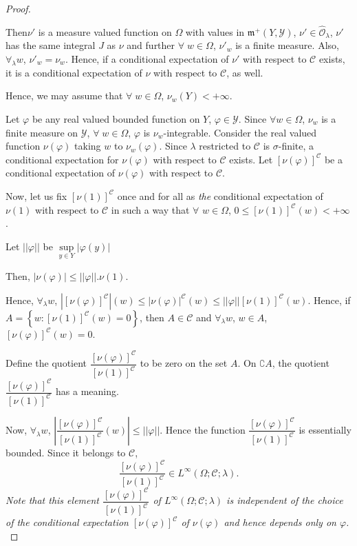 \begin{proof}
\begin{step}
Then\pageoriginale $\nu'$ is a measure valued function on $\Omega$
with values in $\mathfrak{m}^+ (Y, \mathscr{Y})$, $\nu'\in
\hat{\mathscr{O}}_\lambda$, $\nu'$ has the same integral $J$ as $\nu$
and further $\forall \; w \in \Omega$, $\nu'_w$ is a finite
measure. Also, $\forall_\lambda w$, $\nu'_w =\nu_w$. Hence, if a
conditional expectation of $\nu'$ with respect to $\mathscr{C}$
exists, it is a conditional expectation of $\nu$ with respect to
$\mathscr{C}$, as well.
\end{step}

Hence, we may assume that $\forall\; w \in \Omega$, $\nu_w(Y) < +
\infty$. 

Let  $\varphi$ be any real valued bounded function on $Y$, $\varphi
\in \mathscr{Y}$. Since $\forall w \in \Omega$, $\nu_w$ is a finite
measure on $\mathscr{Y}$, $\forall \; w \in \Omega$, $\varphi$ is
$\nu_w$-integrable. Consider the real valued function $\nu(\varphi)$
taking $w$ to $\nu_w(\varphi)$. Since $\lambda$ restricted to
$\mathscr{C}$ is $\sigma$-finite, a conditional expectation for
$\nu(\varphi)$ with respect to $\mathscr{C}$ exists. Let $[\nu
  (\varphi)]^\mathscr{C}$  be a conditional expectation of $\nu
(\varphi)$ with respect to $\mathscr{C}$. 

Now, let us fix $[\nu(1)]^\mathscr{C}$ once and for all as
\textit{the} conditional expectation of $\nu(1)$ with respect to
$\mathscr{C}$ in such a way that $\forall $ $w \in \Omega$, $0 \leq
       [\nu(1)]^\mathscr{C} (w) < + \infty$. 

Let $||\varphi||$ be $\sup\limits_{y \in Y} |\varphi(y)|$ 

Then, $|\nu(\varphi)| \leq ||\varphi||. \nu(1)$. 

Hence, $\forall_\lambda w$, $\left| [\nu
  (\varphi)]^\mathscr{C}\right| (w) \leq |\nu (\varphi)|^\mathscr{C}
(w) \leq ||\varphi|| [\nu(1)]^\mathscr{C} (w)$. Hence, if $A = \left\{
w: [\nu(1)]^\mathscr{C} (w) = 0\right\}$, then $A\in \mathscr{C}$ and
$\forall_\lambda w$, $w \in A$, $[\nu(\varphi)]^\mathscr{C} (w) =0$. 

Define the quotient
$\dfrac{[\nu(\varphi)]^\mathscr{C}}{[\nu(1)]^\mathscr{C}}$ to be zero
on the set $A$. On $\complement A$, the quotient
$\dfrac{[\nu(\varphi)]^\mathscr{C}}{[\nu(1)]^\mathscr{C}}$  has a
meaning. 

Now, $\forall_\lambda w$, $\left|
\dfrac{[\nu(\varphi)]^\mathscr{C}}{[\nu(1)]^\mathscr{C}} (w) \right|
\leq ||\varphi||$. Hence the function
$\dfrac{[\nu(\varphi)]^\mathscr{C}}{[\nu(1)]^\mathscr{C}}$ is
essentially bounded. Since it belongs to $\mathscr{C}$, 
$$
\dfrac{[\nu(\varphi)]^\mathscr{C}}{[\nu(1)]^\mathscr{C}}  \in L^\infty
(\Omega; \mathscr{C}; \lambda). 
$$
{\em Note that this element $\dfrac{[\nu
      (\varphi)]^\mathscr{C}}{[\nu(1)]^\mathscr{C}}$ of $L^\infty
  (\Omega; \mathscr{C}; \lambda)$ is independent of the choice of the
  conditional expectation $[\nu(\varphi)]^\mathscr{C}$ of
  $\nu(\varphi)$ and hence depends only on $\varphi$. } 


\end{proof}
